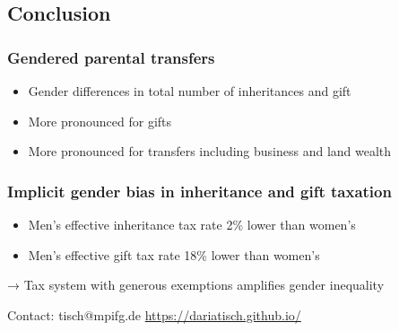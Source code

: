 \documentclass[
  letterpaper,
  DIV=11,
  numbers=noendperiod]{scrartcl}
\providecommand{\tightlist}{%
  \setlength{\itemsep}{0pt}\setlength{\parskip}{0pt}}\usepackage{longtable,booktabs,array}
\begin{document}
\hypertarget{conclusion}{%
\subsection{Conclusion}\label{conclusion}}

\hypertarget{gendered-parental-transfers}{%
\subsubsection{Gendered parental
transfers}\label{gendered-parental-transfers}}

\begin{itemize}
\tightlist
\item
  Gender differences in total number of inheritances and gift
\item
  More pronounced for gifts
\item
  More pronounced for transfers including business and land wealth
\end{itemize}

\hypertarget{implicit-gender-bias-in-inheritance-and-gift-taxation}{%
\subsubsection{Implicit gender bias in inheritance and gift
taxation}\label{implicit-gender-bias-in-inheritance-and-gift-taxation}}

\begin{itemize}
\tightlist
\item
  Men's effective inheritance tax rate 2\% lower than women's
\item
  Men's effective gift tax rate 18\% lower than women's
\end{itemize}

→ Tax system with generous exemptions ampliﬁes gender inequality

{Contact:} {tisch@mpifg.de} \textbar{}
{\url{https://dariatisch.github.io/}}
\end{document}

